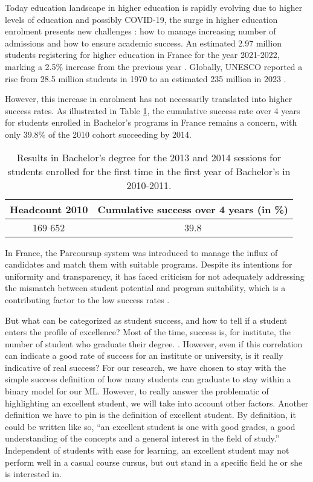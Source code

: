 \documentclass[../main.tex]{subfiles}
\begin{document}
Today education landscape in higher education is rapidly evolving due to higher levels of education and possibly COVID-19, the surge in higher education enrolment presents new challenges : how to manage increasing number of admissions and how to ensure academic success. 
An estimated 2.97 million students registering for higher education in France for the year 2021-2022, marking a 2.5\% increase from the previous year \cite{sous-direction_des_systemes_dinformation_et_des_etudes_statistiques_sies_les_2022}. Globally, UNESCO reported a rise from 28.5 million students in 1970 to an estimated 235 million in 2023 \cite{unesco_higher_2023}.

However, this increase in enrolment has not necessarily translated into higher success rates. As illustrated in Table \ref{tab:result_bachelor}, the cumulative success rate over 4 years for students enrolled in Bachelor's programs in France remains a concern, with only 39.8\% of the 2010 cohort succeeding by 2014.

\begin{table}[H]
    \centering
    \caption{Results in Bachelor's degree for the 2013 and 2014 sessions for students enrolled for the first time in the first year of Bachelor's in 2010-2011.\cite{kabla-langlois_insee_2016}}
    \begin{tabular}{|c|c|}
        \hline
        \textbf{Headcount 2010} & \textbf{Cumulative success over 4 years (in \%)}\\
        \hline
        169 652 & 39.8 \\
        \hline
    \end{tabular}
    \label{tab:result_bachelor}
\end{table}

In France, the Parcoursup system was introduced to manage the influx of candidates and match them with suitable programs. Despite its intentions for uniformity and transparency, it has faced criticism for not adequately addressing the mismatch between student potential and program suitability, which is a contributing factor to the low success rates \cite{couto_parcoursup_2021}.

But what can be categorized as student success, and how to tell if a student enters the profile of excellence? Most of the time, success is, for institute, the number of student who graduate their degree. \cite{weatherton_success_2021}. However, even if this correlation can indicate a good rate of success for an institute or university, is it really indicative of real success? For our research, we have chosen to stay with the simple success definition of how many students can graduate to stay within a binary model for our ML. However, to really answer the problematic of highlighting an excellent student, we will take into account other factors.
Another definition we have to pin is the definition of excellent student. By definition, it could be written like so, “an excellent student is one with good grades, a good understanding of the concepts and a general interest in the field of study.” Independent of students with ease for learning, an excellent student may not perform well in a casual course cursus, but out stand in a specific field he or she is interested in. 
\end{document}
